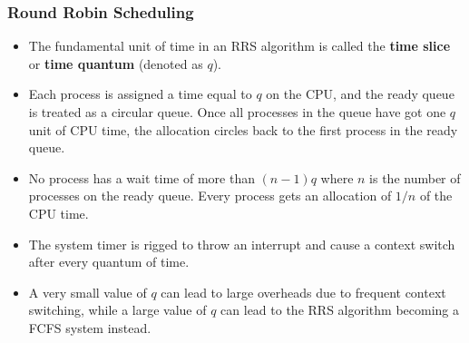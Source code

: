 \documentclass{article}
\theoremstyle{plain}
\theoremstyle{definition}
\begin{document}
\subsubsection{Round Robin Scheduling}
\begin{itemize}
    \item The fundamental unit of time in an RRS algorithm is called the \textbf{time slice} or \textbf{time quantum} (denoted as $q$).
    
    \item Each process is assigned a time equal to $q$ on the CPU, and the ready queue is treated as a circular queue. Once all processes in the queue have got one $q$ unit of CPU time, the allocation circles back to the first process in the ready queue.
    
    \item No process has a wait time of more than $(n-1)q$ where $n$ is the number of processes on the ready queue. Every process gets an allocation of $1/n$ of the CPU time.  
    
    \item The system timer is rigged to throw an interrupt and cause a context switch after every quantum of time. 
    
    \item A very small value of $q$ can lead to large overheads due to frequent context switching, while a large value of $q$ can lead to the RRS algorithm becoming a FCFS system instead.
\end{itemize}
\end{document}
